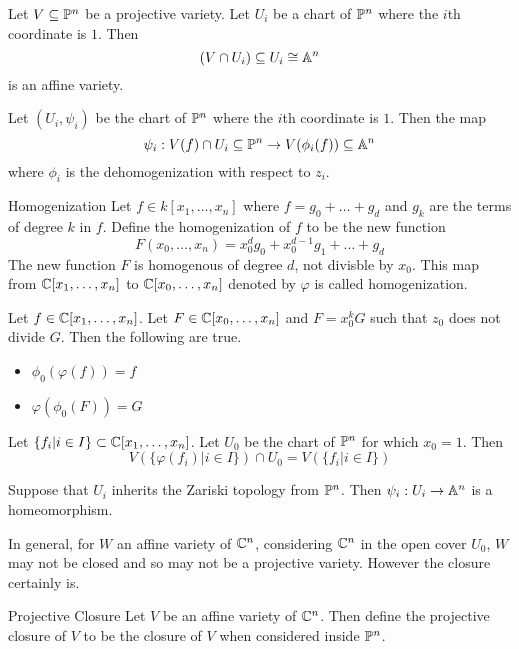 \documentclass[a4paper]{article}
\begin{document}
\begin{lmm}{}{} Let $V\subseteq\mathbb{P}^n$ be a projective variety. Let $U_i$ be a chart of $\mathbb{P}^n$ where the $i$th coordinate is $1$. Then $$(V\cap U_i)\subseteq U_i\cong\mathbb{A}^n$$ is an affine variety. 
\end{lmm}

\begin{thm}{}{} Let $(U_i,\psi_i)$ be the chart of $\mathbb{P}^n$ where the $i$th coordinate is $1$. Then the map $$\psi_i:V(f)\cap U_i\subseteq\mathbb{P}^n\to V(\phi_i(f))\subseteq\mathbb{A}^n$$ where $\phi_i$ is the dehomogenization with respect to $z_i$. 
\end{thm}

\begin{defn}{Homogenization}{} Let $f\in k[x_1,\dots,x_n]$ where $f=g_0+\dots+g_d$ and $g_k$ are the terms of degree $k$ in $f$. Define the homogenization of $f$ to be the new function $$F(x_0,\dots,x_n)=x_0^dg_0+x_0^{d-1}g_1+\dots+g_d$$ The new function $F$ is homogenous of degree $d$, not divisble by $x_0$. This map from $\mathbb{C}[x_1,\dots,x_n]$ to $\mathbb{C}[x_0,\dots,x_n]$ denoted by $\varphi$ is called homogenization. 
\end{defn}

\begin{thm}{}{} Let $f\in\mathbb{C}[x_1,\dots,x_n]$. Let $F\in\mathbb{C}[x_0,\dots,x_n]$ and $F=x_0^kG$ such that $z_0$ does not divide $G$. Then the following are true. 
\begin{itemize}
\item $\phi_0(\varphi(f))=f$
\item $\varphi(\phi_0(F))=G$
\end{itemize}
\end{thm}

\begin{lmm}{}{} Let $\{f_i|i\in I\}\subset\mathbb{C}[x_1,\dots,x_n]$. Let $U_0$ be the chart of $\mathbb{P}^n$ for which $x_0=1$. Then $$V(\{\varphi(f_i)|i\in I\})\cap U_0=V(\{f_i|i\in I\})$$
\end{lmm}

\begin{thm}{}{} Suppose that $U_i$ inherits the Zariski topology from $\mathbb{P}^n$. Then $\psi_i:U_i\to\mathbb{A}^n$ is a homeomorphism. 
\end{thm}

In general, for $W$ an affine variety of $\mathbb{C}^n$, considering $\mathbb{C}^n$ in the open cover $U_0$, $W$ may not be closed and so may not be a projective variety. However the closure certainly is. 

\begin{defn}{Projective Closure}{} Let $V$ be an affine variety of $\mathbb{C}^n$. Then define the projective closure of $V$ to be the closure of $V$ when considered inside $\mathbb{P}^n$. 
\end{defn}
\end{document}
